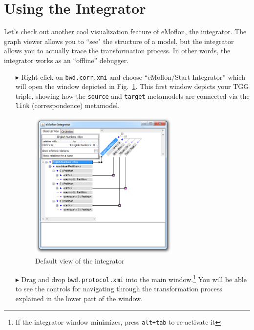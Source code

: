 \newpage
\hypertarget{sec:app_integrator}{}
\section{Using the Integrator}
\genHeader

Let's check out another cool visualization feature of eMoflon, the integrator. The graph viewer allows you to ``see" the structure of a model, but the
integrator allows you to actually trace the transformation process. In other words, the integrator works as an ``offline'' debugger.

\begin{itemize}

\item[$\blacktriangleright$] Right-click on \texttt{bwd.corr.xmi} and choose ``eMoflon/Start Integrator'' which will open the window depicted in
Fig.~\ref{eclipse:integrator_start}. This first window depicts your TGG triple, showing how the \texttt{source} and \texttt{target} metamodels are connected
via the \texttt{link} (correspondence) metamodel.

\begin{figure}[htbp]
\begin{center}
  \includegraphics[width=0.7\textwidth]{eclipse_integratorStart}
  \caption{Default view of the integrator}
  \label{eclipse:integrator_start}
\end{center}
\end{figure}

\item[$\blacktriangleright$] Drag and drop \texttt{bwd.protocol.xmi} into the main window.\footnote{If the integrator window minimizes, press \texttt{alt+tab}
to re-activate it} You will be able to see the controls for navigating through the transformation process explained in the lower part of the window.


\end{itemize}
